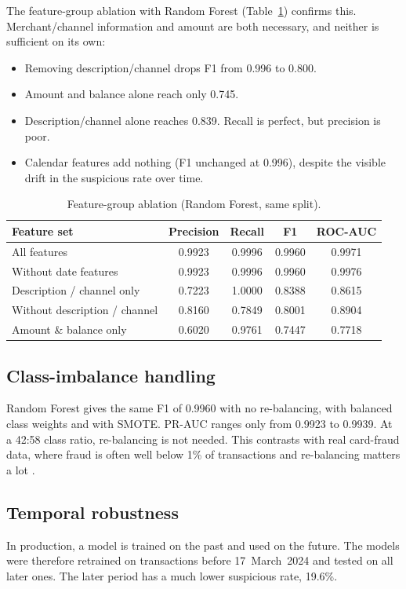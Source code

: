 \documentclass[12pt,a4paper]{article}
\begin{document}
The feature-group ablation with Random Forest (Table~\ref{tab:ablation}) confirms this. Merchant/channel information and amount are both necessary, and neither is sufficient on its own:
\begin{itemize}[nosep]
\item Removing description/channel drops F1 from 0.996 to 0.800.
\item Amount and balance alone reach only 0.745.
\item Description/channel alone reaches 0.839. Recall is perfect, but precision is poor.
\item Calendar features add nothing (F1 unchanged at 0.996), despite the visible drift in the suspicious rate over time.
\end{itemize}

\begin{table}[H]
\centering\small
\caption{Feature-group ablation (Random Forest, same split).}\label{tab:ablation}
\begin{tabular}{lcccc}
\toprule
Feature set & Precision & Recall & F1 & ROC-AUC \\
\midrule
All features & 0.9923 & 0.9996 & 0.9960 & 0.9971 \\
Without date features & 0.9923 & 0.9996 & 0.9960 & 0.9976 \\
Description / channel only & 0.7223 & 1.0000 & 0.8388 & 0.8615 \\
Without description / channel & 0.8160 & 0.7849 & 0.8001 & 0.8904 \\
Amount \& balance only & 0.6020 & 0.9761 & 0.7447 & 0.7718 \\
\bottomrule
\end{tabular}
\end{table}

\subsection{Class-imbalance handling}\label{sec:imb}
Random Forest gives the same F1 of 0.9960 with no re-balancing, with balanced class weights and with SMOTE. PR-AUC ranges only from 0.9923 to 0.9939. At a 42:58 class ratio, re-balancing is not needed. This contrasts with real card-fraud data, where fraud is often well below 1\% of transactions and re-balancing matters a lot \citep{zhang2025intelligent, ali2022financial}.

\subsection{Temporal robustness}
In production, a model is trained on the past and used on the future. The models were therefore retrained on transactions before 17~March~2024 and tested on all later ones. The later period has a much lower suspicious rate, 19.6\%.
\end{document}
